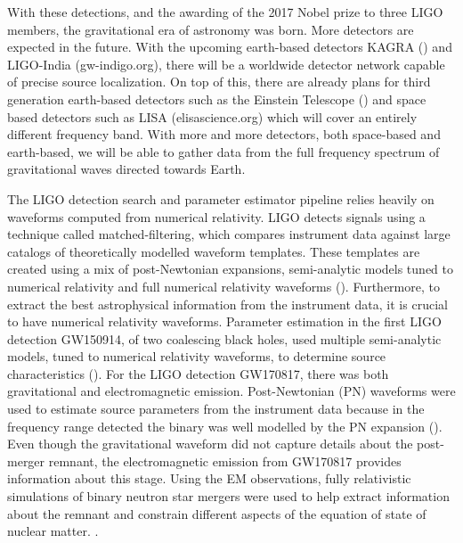 With these detections, and the awarding of the 2017 Nobel prize to three LIGO members, the gravitational era of astronomy was born. More detectors are expected in the future. With the upcoming earth-based detectors KAGRA (\cite{somiya2012detector}) and LIGO-India (gw-indigo.org), there will be a worldwide detector network capable of precise source localization. On top of this, there are already plans for third generation earth-based detectors such as the Einstein Telescope (\cite{einsteintelescope}) and space based detectors such as LISA (elisascience.org) which will cover an entirely different frequency band. With more and more detectors, both space-based and earth-based, we will be able to gather data from the full frequency spectrum of gravitational waves directed towards Earth.

The LIGO detection search and parameter estimator pipeline relies heavily on waveforms computed from numerical relativity. LIGO detects signals using a technique called matched-filtering, which compares instrument data against large catalogs of theoretically modelled waveform templates. These templates are created using a mix of post-Newtonian expansions, semi-analytic models tuned to numerical relativity and full numerical relativity waveforms (\cite{sachdev2019gstlal}). Furthermore, to extract the best astrophysical information from the instrument data, it is crucial to have numerical relativity waveforms. Parameter estimation in the first LIGO detection GW150914, of two coalescing black holes, used multiple semi-analytic models, tuned to numerical relativity waveforms, to determine source characteristics (\cite{abbott2016improved}). For the LIGO detection GW170817, there was both gravitational and electromagnetic emission. Post-Newtonian (PN) waveforms were used to estimate source parameters from the instrument data because in the frequency range detected the binary was well modelled by the PN expansion (\cite{abbott2017gw170817}). Even though the gravitational waveform did not capture details about the post-merger remnant, the electromagnetic emission from GW170817 provides information about this stage. Using the EM observations, fully relativistic simulations of binary neutron star mergers were used to help extract information about the remnant and constrain different aspects of the equation of state of nuclear matter. \cite{radice2017gw170817,shibata2017gw170817}. 

